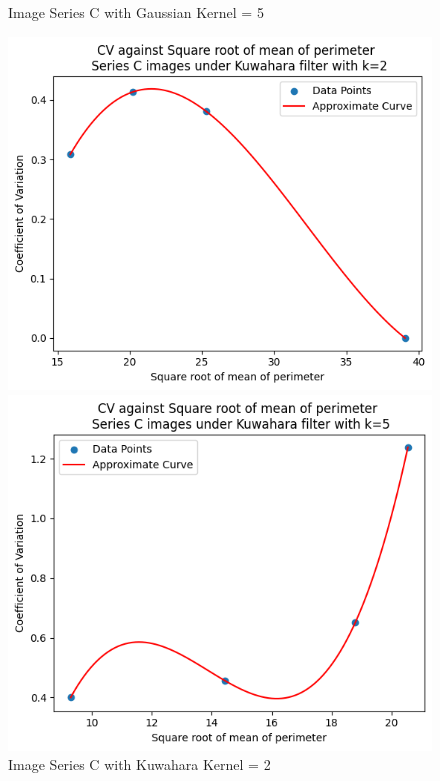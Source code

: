 \documentclass[runningheads]{llncs}
\begin{document}
\begin{figure}[h!]
\begin{minipage}[h]{0.47\linewidth}
\begin{center}
\caption{Image Series C with Gaussian Kernel = 5}
\label{SeriesC-Gaussian-Kernel5-PerimeterGraph}
\end{center}
\end{minipage}
\vfill
\vspace{0.2 cm}
\begin{minipage}[h]{0.47\linewidth}
\begin{center}
\includegraphics[width=1\linewidth]{Report/Result_Images/series_C_Kuwahara_kernel_2_perimeter.png} 
\caption{Image Series C with Kuwahara Kernel = 2}
\label{SeriesC-Kuwahara-Kernel2-PerimeterGraph}
\end{center}
\end{minipage}
\hfill
\begin{minipage}[h]{0.47\linewidth}
\begin{center}
\includegraphics[width=1\linewidth]{Report/Result_Images/series_C_Kuwahara_kernel_5_perimeter.png} 

\end{center}
\end{minipage}
\end{figure}
\end{document}
